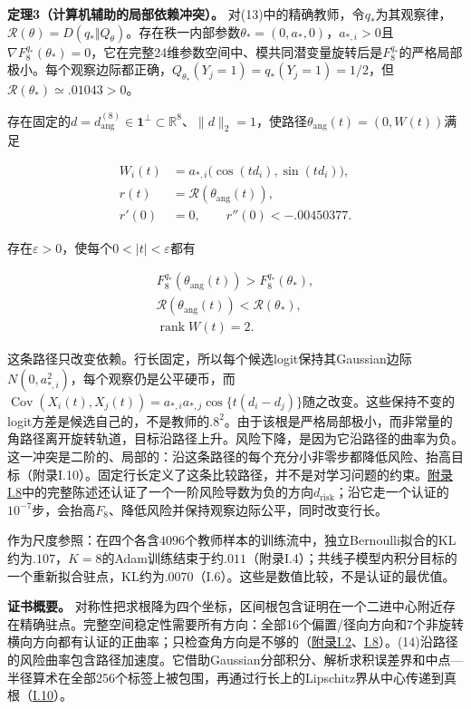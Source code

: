 \documentclass[11pt,a4paper]{article}
\begin{document}
\textbf{定理3（计算机辅助的局部依赖冲突）。}
对(13)中的精确教师，令\(q_*\)为其观察律，\(\mathcal R(\theta)=D(q_*\Vert Q_\theta)\)。存在秩一内部参数\(\theta_*=(0,a_*,0)\)，\(a_{*,i}>0\)且\(\nabla F_8^{q_*}(\theta_*)=0\)，它在完整24维参数空间中、模共同潜变量旋转后是\(F_8^{q_*}\)的严格局部极小。每个观察边际都正确，\(Q_{\theta_*}(Y_j=1)=q_*(Y_j=1)=1/2\)，但\(\mathcal R(\theta_*)\simeq.01043>0\)。

存在固定的\(d=d_{\mathrm{ang}}^{(8)}\in\mathbf1^\perp\subset\mathbb R^8\)、\(\|d\|_2=1\)，使路径\(\theta_{\mathrm{ang}}(t)=(0,W(t))\)满足

\[
\begin{aligned}
W_i(t)&=a_{*,i}\bigl(\cos(td_i),\sin(td_i)\bigr),\\
r(t)&=\mathcal R(\theta_{\mathrm{ang}}(t)),\\
r'(0)&=0,\qquad r''(0)<-.00450377.
\end{aligned}
\tag{14}
\]

存在\(\varepsilon>0\)，使每个\(0<|t|<\varepsilon\)都有

\[
\begin{gathered}
F_8^{q_*}(\theta_{\mathrm{ang}}(t))>F_8^{q_*}(\theta_*),\\
\mathcal R(\theta_{\mathrm{ang}}(t))<\mathcal R(\theta_*),\\
\operatorname{rank}W(t)=2.
\end{gathered}
\tag{15}
\]

这条路径只改变依赖。行长固定，所以每个候选logit保持其Gaussian边际\(N(0,a_{*,i}^2)\)，每个观察仍是公平硬币，而\(\operatorname{Cov}(X_i(t),X_j(t))=a_{*,i}a_{*,j}\cos\{t(d_i-d_j)\}\)随之改变。这些保持不变的logit方差是候选自己的，不是教师的\(.8^2\)。由于该根是严格局部极小，而非常量的角路径离开旋转轨道，目标沿路径上升。风险下降，是因为它沿路径的曲率为负。这一冲突是二阶的、局部的：沿这条路径的每个充分小非零步都降低风险、抬高目标（附录I.10）。固定行长定义了这条比较路径，并不是对学习问题的约束。\hyperref[full-local-statement]{附录I.8}中的完整陈述还认证了一个一阶风险导数为负的方向\(d_{\mathrm{risk}}\)；沿它走一个认证的\(10^{-7}\)步，会抬高\(F_8\)、降低风险并保持观察边际公平，同时改变行长。

作为尺度参照：在四个各含\(4096\)个教师样本的训练流中，独立Bernoulli拟合的KL约为\(.107\)，\(K=8\)的Adam训练结束于约\(.011\)（附录I.4）；共线子模型内积分目标的一个重新拟合驻点，KL约为\(.0070\)（I.6）。这些是数值比较，不是认证的最优值。

\textbf{证书概要。}
对称性把求根降为四个坐标，区间根包含证明在一个二进中心附近存在精确驻点。完整空间稳定性需要所有方向：全部16个偏置/径向方向和7个非旋转横向方向都有认证的正曲率；只检查角方向是不够的（\hyperref[full-hessian-criterion]{附录I.2}、\hyperref[full-local-statement]{I.8}）。(14)沿路径的风险曲率包含路径加速度。它借助Gaussian分部积分、解析求积误差界\citep{trefethen2014}和中点---半径算术\citep{johansson2017}在全部256个标签上被包围，再通过行长上的Lipschitz界从中心传递到真根（\hyperref[same-root-angle]{I.10}）。
\end{document}
